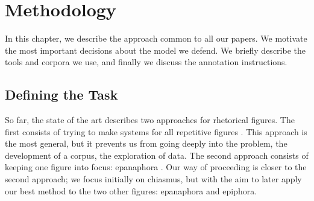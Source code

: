 %
\chapter{\label{chap4}Methodology}%
In this chapter, we describe the approach common to all our papers. We motivate the most important decisions about the model we defend. We briefly describe  the tools and corpora we use, and finally we discuss the annotation instructions.
%
\section{Defining the Task\label{bottomup}}
\label{secGeneric}

%
So far, the state of the art describes two approaches for rhetorical figures. The first consists of trying to make systems for all repetitive figures \citep{gawr,hromada}. This approach is the most general, but it prevents us from going deeply into the problem, the development of a corpus, the exploration of data. The second approach consists of keeping one figure into focus: epanaphora \citep{Strommer2011}. Our way of proceeding is closer to the second approach; we focus initially on chiasmus, but with the aim to later apply our best method to the two other figures: epanaphora and epiphora. 
\noindent

